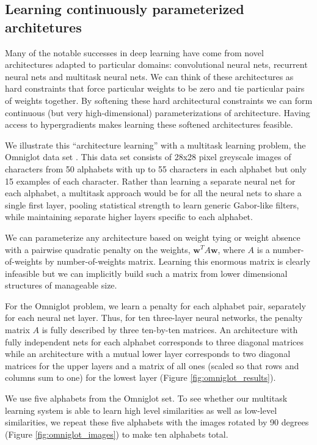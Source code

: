 \documentclass{article}
\newcommand{\vw}{\mathbf{w}}
\begin{document}
\subsection{Learning continuously parameterized architetures}

Many of the notable successes in deep learning have come from novel
architectures adapted to particular domains: convolutional neural nets,
recurrent neural nets and multitask neural nets. We can think of these
architectures as hard constraints that force particular weights to be zero and
tie particular pairs of weights together. By softening these hard architectural
constraints we can form continuous (but very high-dimensional) parameterizations
of architecture. Having access to hypergradients makes learning these
softened architectures feasible.

We illustrate this ``architecture learning'' with a multitask learning
problem, the Omniglot data set \citep{Omniglot}. This data set consists of 28x28
pixel greyscale images of characters from 50 alphabets with up to 55 characters in
each alphabet but only 15 examples of each character. Rather than learning a
separate neural net for each alphabet, a multitask approach would be for all the
neural nets to share a single first layer, pooling statistical strength to learn
generic Gabor-like filters, while maintaining separate higher layers specific to
each alphabet.

We can parameterize any architecture based on weight tying or weight absence
with a pairwise quadratic penalty on the weights, $\vw^T A \vw$, where $A$ is a
number-of-weights by number-of-weights matrix. Learning this enormous matrix is
clearly infeasible but we can implicitly build such a matrix from lower
dimensional structures of manageable size.

For the Omniglot problem, we learn a penalty for each alphabet pair, separately
for each neural net layer. Thus, for ten three-layer neural networks,
the penalty matrix $A$ is fully described by three ten-by-ten matrices. An
architecture with fully independent nets for each alphabet corresponds to three
diagonal matrices while an architecture with a mutual lower layer corresponds to
two diagonal matrices for the upper layers and a matrix of all ones (scaled so
that rows and columns sum to one) for the lowest layer (Figure
\ref{fig:omniglot_results}).

We use five alphabets from the Omniglot set. To see whether our multitask
learning system is able to learn high level similarities as well as
low-level similarities, we repeat these five alphabets with the images rotated
by 90 degrees (Figure \ref{fig:omniglot_images}) to make ten alphabets total.
\end{document}
